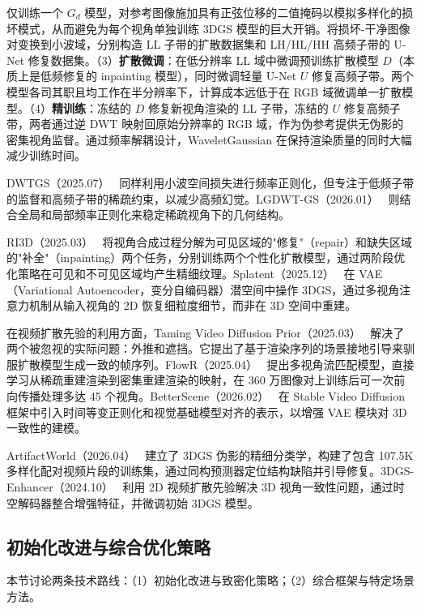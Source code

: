 仅训练一个 $G_d$ 模型，对参考图像施加具有正弦位移的二值掩码以模拟多样化的损坏模式，从而避免为每个视角单独训练 3DGS 模型的巨大开销。将损坏-干净图像对变换到小波域，分别构造 LL 子带的扩散数据集和 LH/HL/HH 高频子带的 U-Net 修复数据集。（3）\textbf{扩散微调}：在低分辨率 LL 域中微调预训练扩散模型 $D$（本质上是低频修复的 inpainting 模型），同时微调轻量 U-Net $U$ 修复高频子带。两个模型各司其职且均工作在半分辨率下，计算成本远低于在 RGB 域微调单一扩散模型。（4）\textbf{精训练}：冻结的 $D$ 修复新视角渲染的 LL 子带，冻结的 $U$ 修复高频子带，两者通过逆 DWT 映射回原始分辨率的 RGB 域，作为伪参考提供无伪影的密集视角监督。通过频率解耦设计，WaveletGaussian 在保持渲染质量的同时大幅减少训练时间。

DWTGS（2025.07）~\cite{2507_15690} 同样利用小波空间损失进行频率正则化，但专注于低频子带的监督和高频子带的稀疏约束，以减少高频幻觉。LGDWT-GS（2026.01）~\cite{2601_17185} 则结合全局和局部频率正则化来稳定稀疏视角下的几何结构。

RI3D（2025.03）~\cite{2503_10860} 将视角合成过程分解为可见区域的"修复"（repair）和缺失区域的"补全"（inpainting）两个任务，分别训练两个个性化扩散模型，通过两阶段优化策略在可见和不可见区域均产生精细纹理。Splatent（2025.12）~\cite{2512_09923} 在 VAE（Variational Autoencoder，变分自编码器）潜空间中操作 3DGS，通过多视角注意力机制从输入视角的 2D 恢复细粒度细节，而非在 3D 空间中重建。

在视频扩散先验的利用方面，Taming Video Diffusion Prior（2025.03）~\cite{2503_05082} 解决了两个被忽视的实际问题：外推和遮挡。它提出了基于渲染序列的场景接地引导来驯服扩散模型生成一致的帧序列。FlowR（2025.04）~\cite{2504_01647} 提出多视角流匹配模型，直接学习从稀疏重建渲染到密集重建渲染的映射，在 360 万图像对上训练后可一次前向传播处理多达 45 个视角。BetterScene（2026.02）~\cite{2602_22596} 在 Stable Video Diffusion 框架中引入时间等变正则化和视觉基础模型对齐的表示，以增强 VAE 模块对 3D 一致性的建模。

ArtifactWorld（2026.04）~\cite{2604_12251} 建立了 3DGS 伪影的精细分类学，构建了包含 107.5K 多样化配对视频片段的训练集，通过同构预测器定位结构缺陷并引导修复。3DGS-Enhancer（2024.10）~\cite{2410_16266} 利用 2D 视频扩散先验解决 3D 视角一致性问题，通过时空解码器整合增强特征，并微调初始 3DGS 模型。

\subsection{初始化改进与综合优化策略}
\label{ss:12_2}

本节讨论两条技术路线：（1）初始化改进与致密化策略；（2）综合框架与特定场景方法。


